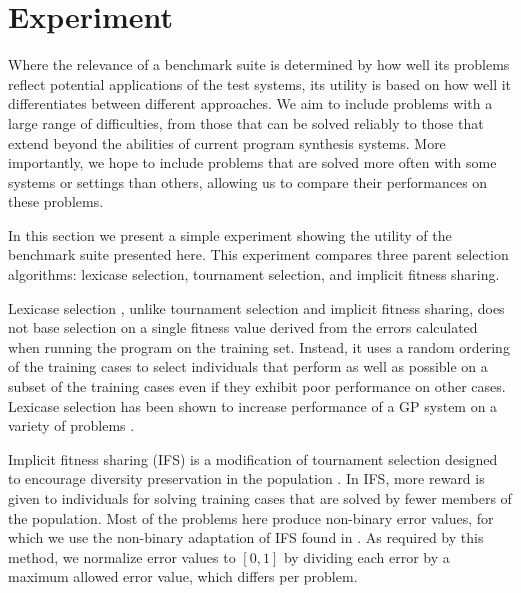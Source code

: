 \documentclass{sig-alternate}
\begin{document}
\section{Experiment}

Where the relevance of a benchmark suite is determined by how well its problems reflect potential applications of the test systems, its utility is based on how well it differentiates between different approaches. We aim to include problems with a large range of difficulties, from those that can be solved reliably to those that extend beyond the abilities of current program synthesis systems. More importantly, we hope to include problems that are solved more often with some systems or settings than others, allowing us to compare their performances on these problems.

In this section we present a simple experiment showing the utility of the benchmark suite presented here. This experiment compares three parent selection algorithms: lexicase selection, tournament selection, and implicit fitness sharing.

Lexicase selection \cite{Helmuth:2014:ieeeTEC, Spector:2012:APM:2330784.2330846}, %
 unlike tournament selection and implicit fitness sharing, does not base selection on a single fitness value derived from the errors calculated when running the program on the training set. Instead, it uses a random ordering of the training cases to select individuals that perform as well as possible on a subset of the training cases even if they exhibit poor performance on other cases. Lexicase selection has been shown to increase performance of a GP system on a variety of problems \cite{Helmuth:2014:ieeeTEC, Helmuth:2014:GECCO, Helmuth:2013:GECCOcomp}. %

Implicit fitness sharing (IFS) is a modification of tournament selection designed to encourage diversity preservation in the population \cite{McKay:2000:GECCO}. In IFS, more reward is given to individuals for solving training cases that are solved by fewer members of the population. Most of the problems here produce non-binary error values, for which we use the non-binary adaptation of IFS found in \cite{Krawiec:2013:EvoIASP}. As required by this method, we normalize error values to $[0, 1]$ by dividing each error by a maximum allowed error value, which differs per problem. 
\end{document}
